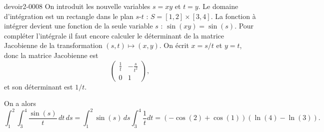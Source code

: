\begin{corrige}{devoir2-0008}
On introduit les nouvelle variables $s=xy$ et $t=y$. Le domaine d'intégration est un rectangle dans le plan $s$-$t$ : $S= [1,2]\times [3,4]$. La fonction à intégrer devient une fonction de la seule variable $s$ : $\sin(xy)=\sin(s)$. Pour compléter l'intégrale il faut encore calculer le déterminant de la matrice Jacobienne de la transformation $(s,t)\mapsto(x,y)$. On écrit $x=s/t$ et $y=t$, donc la matrice Jacobienne est 
\begin{equation}
  \begin{pmatrix}
    \frac{1}{t} & -\frac{s}{t^2}\\
    0 & 1
  \end{pmatrix},
\end{equation}
  et son déterminant est $1/t$. 

On a alors 
\begin{equation}
  \int_1^2\int_3^ 4\frac{\sin(s)}{t}\, dt\, ds=  \int_1^2\sin(s)\,ds\int_3^ 4 \frac{1}{t}dt = \left(-\cos(2)+ \cos(1)\right)\left(\ln(4)-\ln(3)\right).
\end{equation}


\end{corrige}


\clearpage

